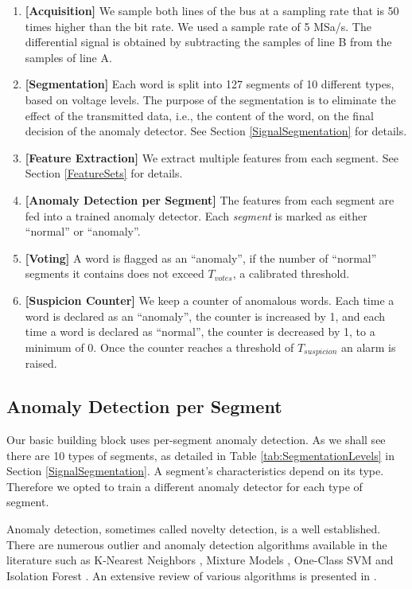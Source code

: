 \documentclass[compsoc,conference,a4paper,10pt,times]{IEEEtran}
\newcommand{\sublevel}[1]{\subsection{#1}}
\newcommand{\sublevel}[1]{\section{#1}}
\begin{document}
  \begin{enumerate}
    \item \textbf{[Acquisition]}
          We sample both lines of the bus at a sampling rate that is 50 times higher than the bit rate. We used a sample rate of 5 MSa/s. The differential signal is obtained by subtracting the samples of line B from the samples of line A.
    \item \textbf{[Segmentation]}
          Each word is split into 127 segments of 10 different types, based on voltage levels. The purpose of the segmentation is to eliminate the effect of the transmitted data, i.e., the content of the word, on the final decision of the anomaly detector. See Section \ref{SignalSegmentation} for details.
    \item \textbf{[Feature Extraction]}
          We extract multiple features from each segment. See Section \ref{FeatureSets} for details.
    \item \textbf{[Anomaly Detection per Segment]}
          The features from each segment are fed into a trained anomaly detector. Each \textit{segment} is marked as either ``normal'' or ``anomaly''.
    \item \textbf{[Voting]}
          A word is flagged as an ``anomaly'', if the number of ``normal'' segments it contains does not exceed $T_{votes}$, a calibrated threshold.
    \item \textbf{[Suspicion Counter]}
          We keep a counter of anomalous words. Each time a word is declared as an ``anomaly'', the counter is increased by 1, and each time a word is declared as ``normal'', the counter is decreased by 1, to a minimum of 0. Once the counter reaches a threshold of $T_{suspicion}$ an alarm is raised.
  \end{enumerate}
  
\sublevel{Anomaly Detection per Segment}
  Our basic building block uses per-segment anomaly detection. As we shall see there are 10 types of segments, as detailed in Table \ref{tab:SegmentationLevels} in Section \ref{SignalSegmentation}. A segment's characteristics depend on its type. Therefore we opted to train a different anomaly detector for each type of segment.
  
  Anomaly detection, sometimes called novelty detection, is a well established. There are numerous outlier and anomaly detection algorithms available in the literature such as K-Nearest Neighbors \cite{hautamaki2004outlier}, Mixture Models \cite{paalanen2006feature}, One-Class SVM \cite{scholkopf2000support} and Isolation Forest \cite{liu2008isolation}. An extensive review of various algorithms is presented in \cite{pimentel2014review}.
  
\end{document}
